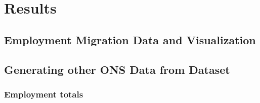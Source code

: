 \documentclass[a4paper,10pt]{article}
\begin{document}
\section{Results}

\subsection{Employment Migration Data and Visualization}
\subsection{Generating other ONS Data from Dataset}
\subsubsection{Employment totals}
\end{document}
